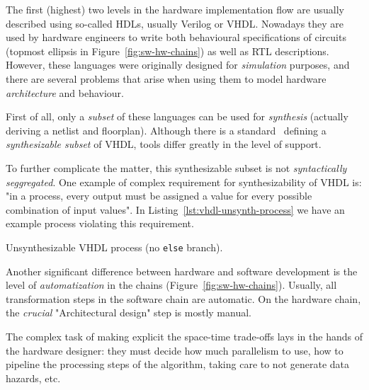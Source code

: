        The first (highest) two levels in the hardware implementation flow are usually described using
        so-called \acp{HDL}, usually Verilog or \acs{VHDL}.
        Nowadays they are used by hardware engineers to write both behavioural specifications of circuits
        (topmost ellipsis in Figure~\ref{fig:sw-hw-chains}) as well as \ac{RTL} descriptions.
        However, these languages were originally designed for \emph{simulation} purposes,
        and there are several problems that arise when using them to
        model hardware \emph{architecture} and behaviour.

        First of all, only a \emph{subset} of these languages can be used for \emph{synthesis}
        (actually deriving a netlist and floorplan).
        Although there is a standard~\cite{ieee1076-3-synth-vhdl} defining a \emph{synthesizable subset} of \acs{VHDL},
        tools differ greatly in the level of support.

        To further complicate the matter, this synthesizable subset is not \emph{syntactically seggregated}.
        One example of complex requirement for synthesizability of \acs{VHDL} is:
        "in a process, every output must be assigned a value for every possible combination of input values".
        In Listing~\ref{lst:vhdl-unsynth-process} we have an example process violating this requirement.

        \begin{listing}[h]
            \begin{center}
            \end{center}
            \caption{Unsynthesizable \acs{VHDL} process (no \texttt{else} branch).
                \label{lst:vhdl-unsynth-process}}
        \end{listing}

        Another significant difference between hardware and software development
        is the level of \emph{automatization} in the chains (Figure~\ref{fig:sw-hw-chains}).
        Usually, all transformation steps in the software chain are automatic.
        On the hardware chain, the \emph{crucial} "Architectural design" step is mostly manual.

        The complex task of making explicit the space-time trade-offs lays in the hands of the hardware designer:
        they must decide how much parallelism to use, how to pipeline the processing steps of the algorithm,
        taking care to not generate data hazards, etc.

